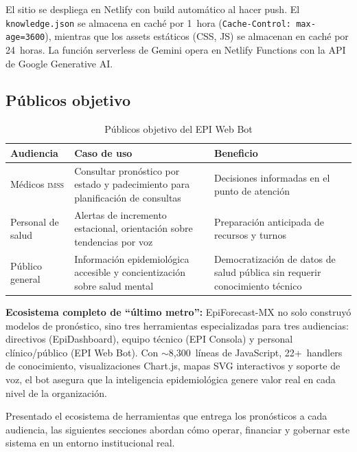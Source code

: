 \documentclass[12pt, letterpaper]{article}
\newenvironment{insightbox}[1][]{\par\medskip\begin{lrbox}{\boxcontents}\begin{minipage}{\dimexpr\textwidth-12pt}\setlength{\emergencystretch}{5em}\setlength{\parskip}{6pt}}{\end{minipage}\end{lrbox}\noindent\colorbox{lightgreen}{\usebox{\boxcontents}}\par\medskip}
\newcommand{\imss}{\textnormal{\textsc{imss}}}
\begin{document}
\medskip

El sitio se despliega en Netlify con build automático al hacer push. El \texttt{knowledge.json} se almacena en caché por 1~hora (\texttt{Cache-Control: max-age=3600}), mientras que los assets estáticos (CSS, JS) se almacenan en caché por 24~horas. La función serverless de Gemini opera en Netlify Functions con la API de Google Generative AI.

\subsection{Públicos objetivo}

\begin{table}[H]
\centering
{}
\caption{Públicos objetivo del EPI Web Bot}
\label{tab:publicos_epibot}
\small
\begin{tabularx}{\textwidth}{l X X}
\toprule
\textbf{Audiencia} & \textbf{Caso de uso} & \textbf{Beneficio} \\
\midrule
Médicos \imss{} & Consultar pronóstico por estado y padecimiento para planificación de consultas & Decisiones informadas en el punto de atención \\
\addlinespace
Personal de salud & Alertas de incremento estacional, orientación sobre tendencias por voz & Preparación anticipada de recursos y turnos \\
\addlinespace
Público general & Información epidemiológica accesible y concientización sobre salud mental & Democratización de datos de salud pública sin requerir conocimiento técnico \\
\bottomrule
\end{tabularx}
\end{table}

\begin{insightbox}
\textbf{Ecosistema completo de ``último metro'':} EpiForecast-MX no solo construyó modelos de pronóstico, sino tres herramientas especializadas para tres audiencias: directivos (EpiDashboard), equipo técnico (EPI Consola) y personal clínico/público (EPI Web Bot). Con $\sim$8,300~líneas de JavaScript, 22+~handlers de conocimiento, visualizaciones Chart.js, mapas SVG interactivos y soporte de voz, el bot asegura que la inteligencia epidemiológica genere valor real en cada nivel de la organización.
\end{insightbox}

Presentado el ecosistema de herramientas que entrega los pronósticos a cada audiencia, las siguientes secciones abordan cómo operar, financiar y gobernar este sistema en un entorno institucional real.
\end{document}
